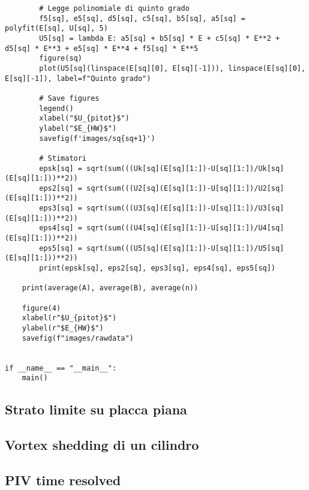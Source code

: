 \begin{lstlisting}
        # Legge polinomiale di quinto grado
        f5[sq], e5[sq], d5[sq], c5[sq], b5[sq], a5[sq] = polyfit(E[sq], U[sq], 5)
        U5[sq] = lambda E: a5[sq] + b5[sq] * E + c5[sq] * E**2 + d5[sq] * E**3 + e5[sq] * E**4 + f5[sq] * E**5
        figure(sq)
        plot(U5[sq](linspace(E[sq][0], E[sq][-1])), linspace(E[sq][0], E[sq][-1]), label=f"Quinto grado")

        # Save figures
        legend()
        xlabel("$U_{pitot}$")
        ylabel("$E_{HW}$")
        savefig(f'images/sq{sq+1}')

        # Stimatori
        epsk[sq] = sqrt(sum(((Uk[sq](E[sq][1:])-U[sq][1:])/Uk[sq](E[sq][1:]))**2))
        eps2[sq] = sqrt(sum(((U2[sq](E[sq][1:])-U[sq][1:])/U2[sq](E[sq][1:]))**2))
        eps3[sq] = sqrt(sum(((U3[sq](E[sq][1:])-U[sq][1:])/U3[sq](E[sq][1:]))**2))
        eps4[sq] = sqrt(sum(((U4[sq](E[sq][1:])-U[sq][1:])/U4[sq](E[sq][1:]))**2))
        eps5[sq] = sqrt(sum(((U5[sq](E[sq][1:])-U[sq][1:])/U5[sq](E[sq][1:]))**2))
        print(epsk[sq], eps2[sq], eps3[sq], eps4[sq], eps5[sq])

    print(average(A), average(B), average(n))

    figure(4)
    xlabel(r"$U_{pitot}$")
    ylabel(r"$E_{HW}$")
    savefig(f"images/rawdata")


if __name__ == "__main__":
    main()
\end{lstlisting}

\subsection{Strato limite su placca piana}\label{b9}

\subsection{Vortex shedding di un cilindro}\label{b10}

\subsection{PIV time resolved}\label{b11}

